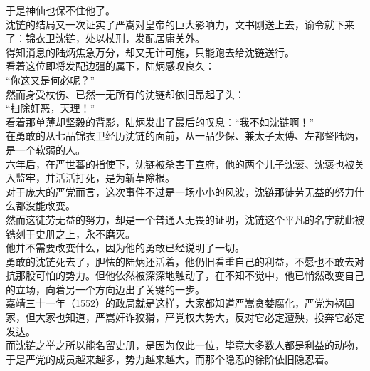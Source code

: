 \begin{multicols}{\theparacolNo}
于是神仙也保不住他了。\\

沈链的结局又一次证实了严嵩对皇帝的巨大影响力，文书刚送上去，谕令就下来了：锦衣卫沈链，处以杖刑，发配居庸关外。\\

得知消息的陆炳焦急万分，却又无计可施，只能跑去给沈链送行。\\

看着这位即将发配边疆的属下，陆炳感叹良久：\\

“你这又是何必呢？”\\

然而身受杖伤、已然一无所有的沈链却依旧昂起了头：\\

“扫除奸恶，天理！”\\

看着那单薄却坚毅的背影，陆炳发出了最后的叹息：“我不如沈链啊！”\\

在勇敢的从七品锦衣卫经历沈链的面前，从一品少保、兼太子太傅、左都督陆炳，是一个软弱的人。\\

六年后，在严世蕃的指使下，沈链被杀害于宣府，他的两个儿子沈衮、沈褒也被关入监牢，并活活打死，是为斩草除根。\\

对于庞大的严党而言，这次事件不过是一场小小的风波，沈链那徒劳无益的努力什么都没能改变。\\

然而这徒劳无益的努力，却是一个普通人无畏的证明，沈链这个平凡的名字就此被镌刻于史册之上，永不磨灭。\\

他并不需要改变什么，因为他的勇敢已经说明了一切。\\

勇敢的沈链死去了，胆怯的陆炳还活着，他仍旧看重自己的利益，不愿也不敢去对抗那股可怕的势力。但他依然被深深地触动了，在不知不觉中，他已悄然改变自己的立场，向着另一个方向迈出了关键的一步。\\

嘉靖三十一年（1552）的政局就是这样，大家都知道严嵩贪婪腐化，严党为祸国家，但大家也知道，严嵩奸诈狡猾，严党权大势大，反对它必定遭殃，投奔它必定发达。\\

而沈链之举之所以能名留史册，是因为仅此一位，毕竟大多数人都是利益的动物，于是严党的成员越来越多，势力越来越大，而那个隐忍的徐阶依旧隐忍着。\\


\end{multicols}
